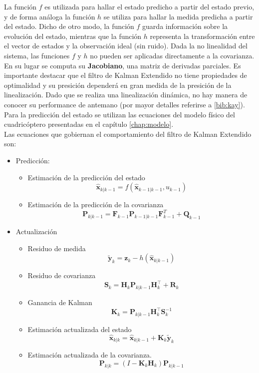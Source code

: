 \documentclass[main]{subfiles}
\begin{document}
La función $f$ es utilizada para hallar el estado predicho a partir del estado previo, y de forma análoga la función $h$ se utiliza para hallar la medida predicha a partir del estado. Dicho de otro modo, la función $f$ guarda información sobre la evolución del estado, mientras que la función $h$ representa la transformación entre el vector de estados y la observación ideal (sin ruido). Dada la no linealidad del sistema, las funciones $f$ y $h$ no pueden ser aplicadas directamente a la covarianza. En su lugar se computa su \textbf{Jacobiano}, una matriz de derivadas parciales. Es importante destacar que el filtro de Kalman Extendido no tiene propiedades de optimalidad y su presición dependerá en gran medida de la presición de la linealización. Dado que se realiza una linealización dinámica, no hay manera de conocer su performance de antemano (por mayor detalles referirse a \ref{bib:kay}).\\
Para la predicción del estado se utilizan las ecuaciones del modelo físico del cuadricóptero presentadas en el capítulo \ref{chap:modelo}.\\

Las ecuaciones que gobiernan el comportamiento del filtro de Kalman Extendido son:
\begin{itemize}
	\item Predicción:
	\begin{itemize}
		\item Estimación de la predicción del estado
		$$\hat{\mathbf{x}}_{k|k-1} = f(\hat{\mathbf{x}}_{k-1|k-1}, u_{k-1})$$
		\item Estimación de la predicción de la covarianza
		$$ \mathbf{P}_{k|k-1} =  {{\mathbf{F}_{k-1}}} \mathbf{P}_{k-1|k-1}{  {\mathbf{F}_{k-1}^T}} + \mathbf{Q}_{k-1} $$		
	\end{itemize}
	\item Actualización
	\begin{itemize}
		\item Residuo de medida
		$$\tilde{\mathbf{y}}_{k} = \mathbf{z}_{k} - h(\hat{\mathbf{x}}_{k|k-1})$$
		\item Residuo de covarianza
		$$\mathbf{S}_{k} = { \mathbf{H}_{k}}\mathbf{P}_{k|k-1}{ \mathbf{H}_{k}^\top} + \mathbf{R}_{k}$$
		\item Ganancia de Kalman
		$$\mathbf{K}_{k} = \mathbf{P}_{k|k-1}{ \mathbf{H}_{k}^\top}\mathbf{S}_{k}^{-1} $$
		\item Estimación actualizada del estado
		$$\hat{\mathbf{x}}_{k|k} = \hat{\mathbf{x}}_{k|k-1} + \mathbf{K}_{k}\tilde{\mathbf{y}}_{k} $$
		\item Estimación actualizada de la covarianza.
		$$ \mathbf{P}_{k|k} = (I - \mathbf{K}_{k} { \mathbf{H}_{k}}) \mathbf{P}_{k|k-1} $$		
	\end{itemize}
\end{itemize}
\end{document}
